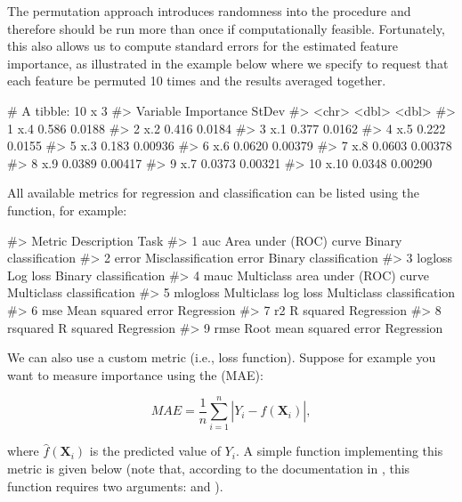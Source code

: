 The permutation approach introduces randomness into the procedure and therefore should be run more than once if computationally feasible. Fortunately, this also allows us to compute standard errors for the estimated feature importance, as illustrated in the example below where we specify  to request that each feature be permuted 10 times and the results averaged together.

\begin{example}
# A tibble: 10 x 3
#>    Variable Importance   StDev
#>    <chr>         <dbl>   <dbl>
#>  1 x.4          0.586  0.0188 
#>  2 x.2          0.416  0.0184 
#>  3 x.1          0.377  0.0162 
#>  4 x.5          0.222  0.0155 
#>  5 x.3          0.183  0.00936
#>  6 x.6          0.0620 0.00379
#>  7 x.8          0.0603 0.00378
#>  8 x.9          0.0389 0.00417
#>  9 x.7          0.0373 0.00321
#> 10 x.10         0.0348 0.00290
\end{example}

All available metrics for regression and classification can be listed using the  function, for example:

\begin{example}
#>     Metric                       Description                      Task
#> 1      auc            Area under (ROC) curve     Binary classification
#> 2    error           Misclassification error     Binary classification
#> 3  logloss                          Log loss     Binary classification
#> 4     mauc Multiclass area under (ROC) curve Multiclass classification
#> 5 mlogloss               Multiclass log loss Multiclass classification
#> 6      mse                Mean squared error                Regression
#> 7       r2                         R squared                Regression
#> 8 rsquared                         R squared                Regression
#> 9     rmse           Root mean squared error                Regression
\end{example}

We can also use a custom metric (i.e., loss function). Suppose for example you want to measure importance using the  (MAE): 

\begin{equation}
  MAE = \frac{1}{n}\sum_{i = 1}^n\left|Y_i - \widehat{f}\left(\boldsymbol{X}_i\right)\right|,
\end{equation}

where $\widehat{f}\left(\boldsymbol{X}_i\right)$ is the predicted value of $Y_i$. A simple function implementing this metric is given below (note that, according to the documentation in , this function requires two arguments:  and ).

